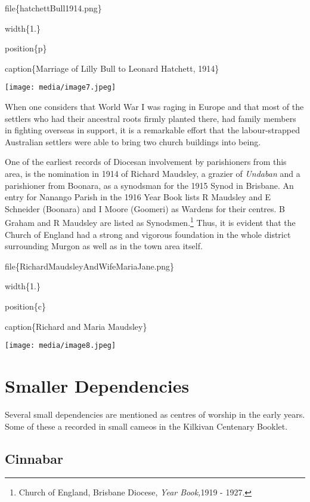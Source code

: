 file\{hatchettBull1914.png\}

width\{1.\}

position\{p\}

caption\{Marriage of Lilly Bull to Leonard Hatchett, 1914\}

\texttt{[image: media/image7.jpeg]}

When one considers that World War I was raging in Europe and that most of the settlers who had their ancestral roots firmly planted there, had family members in fighting overseas in support, it is a remarkable effort that the labour-strapped Australian settlers were able to bring two church buildings into being.

One of the earliest records of Diocesan involvement by parishioners from this area, is the nomination in 1914 of Richard Maudsley, a grazier of \emph{Undaban} and a parishioner from Boonara, as a synodsman for the 1915 Synod in Brisbane. An entry for Nanango Parish in the 1916 Year Book lists R Maudsley and E Schneider (Boonara) and I Moore (Goomeri) as Wardens for their centres. B Graham and R Maudsley are listed as Synodsmen.\footnote{Church of England, Brisbane Diocese, \emph{Year Book,}1919 - 1927.} Thus, it is evident that the Church of England had a strong and vigorous foundation in the whole district surrounding Murgon as well as in the town area itself.

file\{RichardMaudsleyAndWifeMariaJane.png\}

width\{1.\}

position\{c\}

caption\{Richard and Maria Maudsley\}

\texttt{[image: media/image8.jpeg]}

\hypertarget{smaller-dependencies}{%
\section{Smaller Dependencies}\label{smaller-dependencies}}

Several small dependencies are mentioned as centres of worship in the early years. Some of these a recorded in small cameos in the Kilkivan Centenary Booklet.

\hypertarget{cinnabar}{%
\subsection{Cinnabar}\label{cinnabar}}

